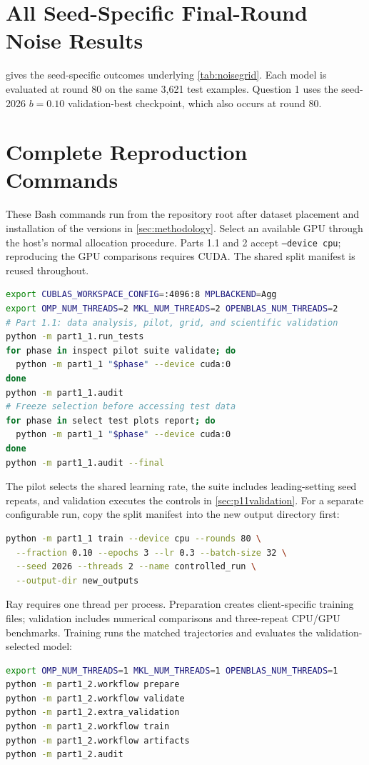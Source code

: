 \section{All Seed-Specific Final-Round Noise Results}\label{app:allnoise}

 gives the seed-specific outcomes underlying \cref{tab:noisegrid}. Each model is evaluated at round 80 on the same 3,621 test examples. Question 1 uses the seed-2026 $b=0.10$ validation-best checkpoint, which also occurs at round 80.

\section{Complete Reproduction Commands}\label{app:reproduction}
These Bash commands run from the repository root after dataset placement and installation of the versions in \cref{sec:methodology}. Select an available GPU through the host's normal allocation procedure. Parts 1.1 and 2 accept \texttt{--device cpu}; reproducing the GPU comparisons requires CUDA. The shared split manifest is reused throughout.

\begin{lstlisting}[language=bash]
export CUBLAS_WORKSPACE_CONFIG=:4096:8 MPLBACKEND=Agg
export OMP_NUM_THREADS=2 MKL_NUM_THREADS=2 OPENBLAS_NUM_THREADS=2
# Part 1.1: data analysis, pilot, grid, and scientific validation
python -m part1_1.run_tests
for phase in inspect pilot suite validate; do
  python -m part1_1 "$phase" --device cuda:0
done
python -m part1_1.audit
# Freeze selection before accessing test data
for phase in select test plots report; do
  python -m part1_1 "$phase" --device cuda:0
done
python -m part1_1.audit --final
\end{lstlisting}
The pilot selects the shared learning rate, the suite includes leading-setting seed repeats, and validation executes the controls in \cref{sec:p11validation}. For a separate configurable run, copy the split manifest into the new output directory first:
\begin{lstlisting}[language=bash]
python -m part1_1 train --device cpu --rounds 80 \
  --fraction 0.10 --epochs 3 --lr 0.3 --batch-size 32 \
  --seed 2026 --threads 2 --name controlled_run \
  --output-dir new_outputs
\end{lstlisting}

Ray requires one thread per process. Preparation creates client-specific training files; validation includes numerical comparisons and three-repeat CPU/GPU benchmarks. Training runs the matched trajectories and evaluates the validation-selected model:
\begin{lstlisting}[language=bash]
export OMP_NUM_THREADS=1 MKL_NUM_THREADS=1 OPENBLAS_NUM_THREADS=1
python -m part1_2.workflow prepare
python -m part1_2.workflow validate
python -m part1_2.extra_validation
python -m part1_2.workflow train
python -m part1_2.workflow artifacts
python -m part1_2.audit
\end{lstlisting}

